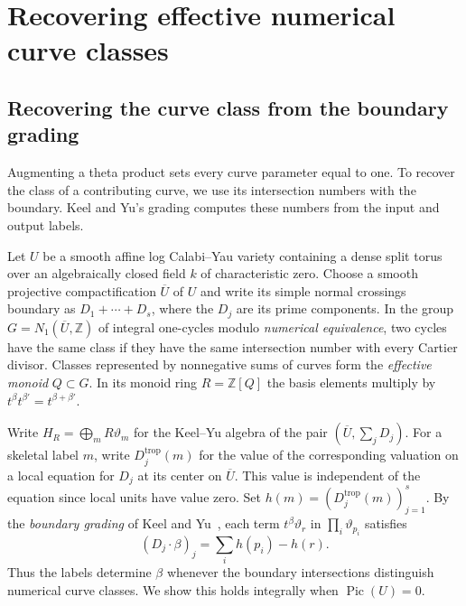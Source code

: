 \documentclass[11pt,reqno]{amsart}
\numberwithin{equation}{section}
\theoremstyle{definition}
\theoremstyle{remark}
\DeclareMathOperator{\Pic}{Pic}
\begin{document}
\section{Recovering effective numerical curve classes}\label{sec:coefficient-recovery}

\subsection{Recovering the curve class from the boundary grading}

Augmenting a theta product sets every curve parameter equal to one.
To recover the class of a contributing curve, we use its intersection
numbers with the boundary. Keel and Yu's grading computes these numbers
from the input and output labels.

Let \(U\) be a smooth affine log Calabi--Yau variety containing a dense
split torus over an algebraically closed field \(k\) of characteristic
zero. Choose a smooth projective compactification \(\overline U\) of \(U\) and write its
simple normal crossings boundary as \(D_1+\cdots+D_s\), where the
\(D_j\) are its prime components. In the group
\(G=N_1(\overline U,\mathbb Z)\) of integral one-cycles modulo
\emph{numerical equivalence}, two cycles have the same class if they
have the same intersection number with every Cartier divisor. Classes
represented by nonnegative sums of curves form the \emph{effective
monoid} \(Q\subset G\). In its monoid ring \(R=\mathbb Z[Q]\) the basis
elements multiply by \(t^\beta t^{\beta'}=t^{\beta+\beta'}\).

Write \(H_R=\bigoplus_m R\vartheta_m\) for the Keel--Yu algebra of
the pair \((\overline U,\sum_j D_j)\). For a skeletal label \(m\),
write \(D_j^{\mathrm{trop}}(m)\) for the value of the corresponding
valuation on a local equation for \(D_j\) at its center on \(\overline U\).
This value is independent of the equation since local units have value
zero. Set \(h(m)=(D_j^{\mathrm{trop}}(m))_{j=1}^s\).
By the \emph{boundary grading}
of Keel and Yu~\cite[Lemma~16.1 and Theorem~16.2]{KY}, each term
\(t^\beta\vartheta_r\) in \(\prod_i\vartheta_{p_i}\) satisfies
\begin{equation}\label{eq:curve-boundary-grading}
(D_j\cdot\beta)_j=\sum_i h(p_i)-h(r).
\end{equation}
Thus the labels determine
\(\beta\) whenever the boundary intersections distinguish numerical
curve classes. We show this holds integrally when \(\Pic(U)=0\).
\end{document}
